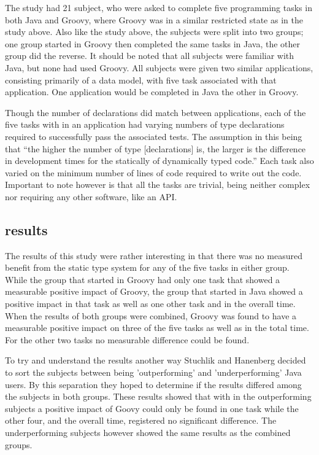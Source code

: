 \documentclass{sig-alternate}
\begin{document}
The study had 21 subject, who were asked to complete five programming tasks in both Java and Groovy, where Groovy was in a similar restricted state as in the study above. Also like the study above, the subjects were split into two groups; one group started in Groovy then completed the same tasks in Java, the other group did the reverse. It should be noted that all subjects were familiar with Java, but none had used Groovy. All subjects were given two similar applications, consisting primarily of a data model, with five task associated with that application. One application would be completed in Java the other in Groovy.


Though the number of declarations did match between applications, each of the five tasks with in an application had varying numbers of type declarations required to successfully pass the associated tests. The assumption in this being that ``the higher the number of type [declarations] is, the larger is the difference in development times for the statically of dynamically typed code.''\cite{Stuchlik2011} Each task also varied on the minimum number of lines of code required to write out the code. Important to note however is that all the tasks are trivial, being neither complex nor requiring any other software, like an API. 
 
\subsection{results}
The results of this study were rather interesting in that there was no measured benefit from the static type system for any of the five tasks in either group. While the group that started in Groovy had only one task that showed a measurable positive impact of Groovy, the group that started in Java showed a positive impact in that task as well as one other task and in the overall time. When the results of both groups were combined, Groovy was found to have a measurable positive impact on three of the five tasks as well as in the total time. For the other two tasks no measurable difference could be found.

To try and understand the results another way Stuchlik and Hanenberg decided to sort the subjects between being 'outperforming' and 'underperforming' Java users. By this separation they hoped to determine if the results differed among the subjects in both groups. These results showed that with in the outperforming subjects a positive impact of Goovy could only be found in one task while the other four, and the overall time, registered no significant difference. The underperforming subjects however showed the same results as the combined groups.
\end{document}
